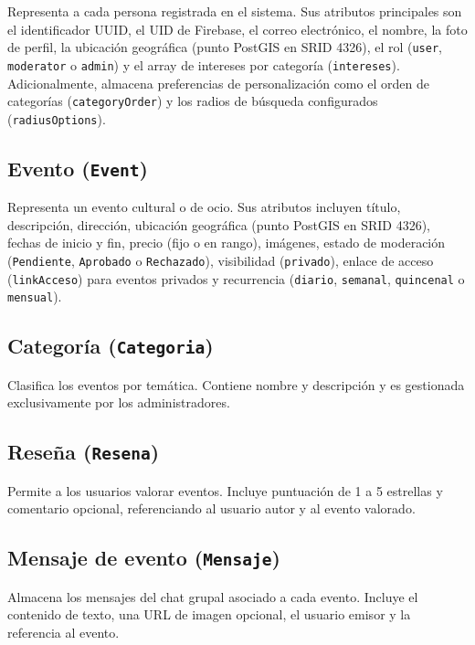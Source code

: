 Representa a cada persona registrada en el sistema. Sus atributos principales son el identificador UUID, el UID de Firebase, el correo electrónico, el nombre, la foto de perfil, la ubicación geográfica (punto PostGIS en SRID 4326), el rol (\texttt{user}, \texttt{moderator} o \texttt{admin}) y el array de intereses por categoría (\texttt{intereses}). Adicionalmente, almacena preferencias de personalización como el orden de categorías (\texttt{categoryOrder}) y los radios de búsqueda configurados (\texttt{radiusOptions}).

\subsection{Evento (\texttt{Event})}

Representa un evento cultural o de ocio. Sus atributos incluyen título, descripción, dirección, ubicación geográfica (punto PostGIS en SRID 4326), fechas de inicio y fin, precio (fijo o en rango), imágenes, estado de moderación (\texttt{Pendiente}, \texttt{Aprobado} o \texttt{Rechazado}), visibilidad (\texttt{privado}), enlace de acceso (\texttt{linkAcceso}) para eventos privados y recurrencia (\texttt{diario}, \texttt{semanal}, \texttt{quincenal} o \texttt{mensual}).

\subsection{Categoría (\texttt{Categoria})}

Clasifica los eventos por temática. Contiene nombre y descripción y es gestionada exclusivamente por los administradores.

\subsection{Reseña (\texttt{Resena})}

Permite a los usuarios valorar eventos. Incluye puntuación de 1 a 5 estrellas y comentario opcional, referenciando al usuario autor y al evento valorado.

\subsection{Mensaje de evento (\texttt{Mensaje})}

Almacena los mensajes del chat grupal asociado a cada evento. Incluye el contenido de texto, una URL de imagen opcional, el usuario emisor y la referencia al evento.

